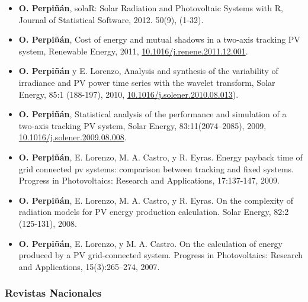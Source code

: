 \documentclass[article, a4paper]{memoir}
\begin{document}
\begin{itemize}
\item \textbf{O. Perpiñán}, solaR: Solar Radiation and Photovoltaic Systems with R,
Journal of Statistical Software, 2012. 50(9), (1-32).

\item \textbf{O. Perpiñán}, Cost of energy and mutual shadows in a two-axis
tracking PV system, Renewable Energy, 2011,
\url{10.1016/j.renene.2011.12.001}.

\item \textbf{O. Perpiñán} y E. Lorenzo, Analysis and synthesis of the
variability of irradiance and PV power time series with the wavelet
transform, Solar Energy, 85:1 (188-197), 2010,
\url{10.1016/j.solener.2010.08.013}).

\item \textbf{O. Perpiñán}, Statistical analysis of the performance and
simulation of a two-axis tracking PV system, Solar Energy,
83:11(2074–2085), 2009, \url{10.1016/j.solener.2009.08.008}.

\item \textbf{O. Perpiñán}, E. Lorenzo, M. A. Castro, y R. Eyras. Energy payback
time of grid connected pv systems: comparison between tracking and
fixed systems. Progress in Photovoltaics: Research and Applications,
17:137-147, 2009.

\item \textbf{O. Perpiñán}, E. Lorenzo, M. A. Castro, y R. Eyras. On the
complexity of radiation models for PV energy production
calculation. Solar Energy, 82:2 (125-131), 2008.

\item \textbf{O. Perpiñán}, E. Lorenzo, y M. A. Castro. On the calculation of
energy produced by a PV grid-connected system. Progress in
Photovoltaics: Research and Applications, 15(3):265–274, 2007.
\end{itemize}
\subsubsection{Revistas Nacionales}
\label{sec-5-2-2}
\end{document}
